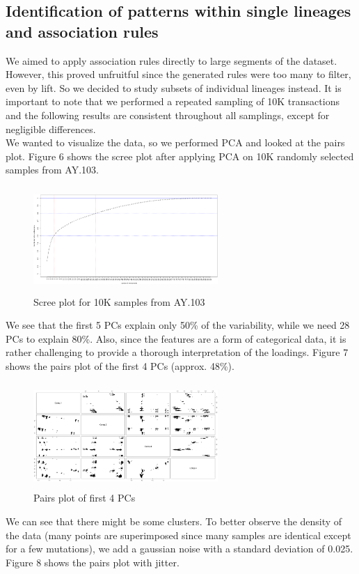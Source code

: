 \documentclass[twoside,twocolumn]{article}
\begin{document}
	\subsection{Identification of patterns within single lineages and association rules}
	
	We aimed to apply association rules directly to large segments of the dataset. However, this proved unfruitful since the generated rules were too many to filter, even by lift. So we decided to study subsets of individual lineages instead. It is important to note that we performed a repeated sampling of 10K transactions and the following results are consistent throughout all samplings, except for negligible differences. \\We wanted to visualize the data, so we performed PCA and looked at the pairs plot. Figure 6 shows the scree plot after applying PCA on 10K randomly selected samples from AY.103.
	\begin{figure}[h]
		\caption{Scree plot for 10K samples from AY.103}
		\label{screeplot1}
		\centering
		\includegraphics[width=70mm, height=40mm]{scree.png}
	\end{figure}
	We see that the first 5 PCs explain only 50\% of the variability, while we need 28 PCs to explain 80\%. Also, since the features are a form of categorical data, it is rather challenging to provide a thorough interpretation of the loadings. Figure 7 shows the pairs plot of the first 4 PCs (approx. 48\%).
	\begin{figure}[h]
		\caption{Pairs plot of first 4 PCs}
		\label{pairs}
		\centering
		\includegraphics[width=70mm, height=40mm]{pca1.png}
	\end{figure}
	We can see that there might be some clusters. To better observe the density of the data (many points are superimposed since many samples are identical except for a few mutations), we add a gaussian noise with a standard deviation of 0.025. Figure 8 shows the pairs plot with jitter.
\end{document}
